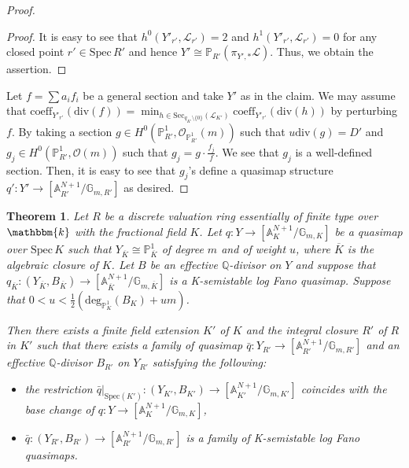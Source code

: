 \documentclass[12pt,twoside]{amsart}
\newtheorem{thm}{Theorem}[section]
\theoremstyle{definition}
\begin{document}
\begin{proof}
\begin{proof}[Proof]
    It is easy to see that $h^0(Y'_{r'},\mathcal{L}_{r'})=2$ and $h^1(Y'_{r'},\mathcal{L}_{r'})=0$ for any closed point $r'\in\mathrm{Spec}\,R'$ and hence $Y'\cong\mathbb{P}_{R'}(\pi_{Y',*}\mathcal{L})$.
    Thus, we obtain the assertion.
\end{proof}
Let $f=\sum a_if_i$ be a general section and take $Y'$ as in the claim.
We may assume that $\mathrm{coeff}_{Y'_{r'}}(\mathrm{div}(f))=\min_{h\in\mathrm{Sec}_{q_{K'}\setminus\{0\}}(\mathscr{L}_{K'})}\mathrm{coeff}_{Y'_{r'}}(\mathrm{div}(h)) $ by perturbing $f$.
By taking a section $g\in H^0(\mathbb{P}^1_{R'},\mathcal{O}_{\mathbb{P}^1_{R'}}(m))$ such that $u\mathrm{div}(g)=D'$ and $g_j\in H^0(\mathbb{P}^1_{R'},\mathcal{O}(m))$ such that $g_j=g\cdot \frac{f_j}{f}$.
We see that $g_j$ is a well-defined section. 
Then, it is easy to see that $g_j$'s define a quasimap structure $q'\colon Y'\to[\mathbb{A}^{N+1}_{R'}/\mathbb{G}_{m,R'}]$ as desired.
\end{proof}



\begin{thm}\label{thm--properness}
    Let $R$ be a discrete valuation ring essentially of finite type over $\mathbbm{k}$ with the fractional field $K$.
    Let $q\colon Y\to[\mathbb{A}^{N+1}_K/\mathbb{G}_{m,K}]$ be a quasimap over $\mathrm{Spec}\,K$ such that $Y_{\overline{K}}\cong\mathbb{P}^1_{\overline{K}}$ of degree $m$ and of weight $u$, where $\overline{K}$ is the algebraic closure of $K$.
    Let $B$ be an effective $\mathbb{Q}$-divisor on $Y$ and suppose that $q_{\overline{K}}\colon (Y_{\overline{K}},B_{\overline{K}})\to[\mathbb{A}^{N+1}_{\overline{K}}/\mathbb{G}_{m,\overline{K}}]$ is a K-semistable log Fano quasimap.
    Suppose that $0<u<\frac{1}{2}\left(\mathrm{deg}_{\mathbb{P}_K^1}(B_{K})+um\right)$.

    Then there exists a finite field extension $K'$ of $K$ and the integral closure $R'$ of $R$ in $K'$ such that there exists a family of quasimap $\bar{q}\colon Y_{R'}\to [\mathbb{A}^{N+1}_{R'}/\mathbb{G}_{m,R'}]$ and an effective $\mathbb{Q}$-divisor $B_{R'}$ on $Y_{R'}$ satisfying the following:
    \begin{itemize}
    \item the restriction $\bar{q}|_{\mathrm{Spec}(K')}\colon (Y_{K'},B_{K'})\to [\mathbb{A}^{N+1}_{K'}/\mathbb{G}_{m,K'}]$ coincides with the base change of $q\colon Y\to[\mathbb{A}^{N+1}_K/\mathbb{G}_{m,K}]$, 
        \item $\bar{q}\colon (Y_{R'},B_{R'})\to [\mathbb{A}^{N+1}_{R'}/\mathbb{G}_{m,R'}]$ is a family of K-semistable log Fano quasimaps.
    \end{itemize}
\end{thm}
\end{document}
